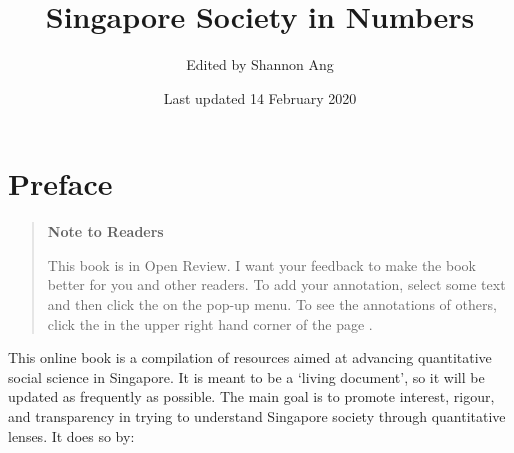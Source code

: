 \documentclass[openany]{book}
\title{Singapore Society in Numbers}
\author{Edited by Shannon Ang}
\date{Last updated 14 February 2020}
\begin{document}
\maketitle

{
\setcounter{tocdepth}{1}
\tableofcontents
}
\chapter*{Preface}\label{preface}

\begin{quote}
\textbf{Note to Readers}

This book is in Open Review. I want your feedback to make the book
better for you and other readers. To add your annotation, {select some
text} and then click the on the pop-up menu. To see the annotations of
others, click the in the upper right hand corner of the page .
\end{quote}

This online book is a compilation of resources aimed at advancing
quantitative social science in Singapore. It is meant to be a `living
document', so it will be updated as frequently as possible. The main
goal is to promote interest, rigour, and transparency in trying to
understand Singapore society through quantitative lenses. It does so by:
\end{document}
